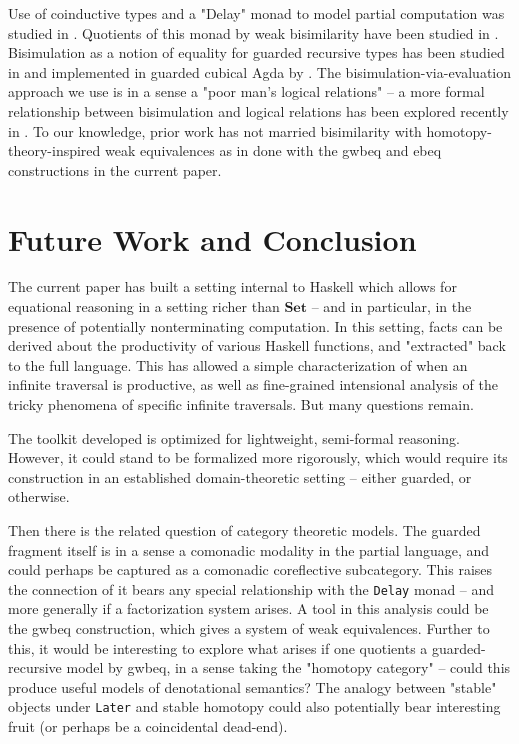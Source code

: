 \documentclass[hoptionsi,review,format=sigplan]{acmart}
\newcommand{\hs}{\texttt}
\begin{document}
Use of coinductive types and a "Delay" monad to model partial computation was studied in \cite{capretta2005general}. Quotients of this monad by weak bisimilarity have been studied in \cite{chapman2019quotienting, uustalu2017delay, altenkirch2017partiality}. Bisimulation as a notion of equality for guarded recursive types has been studied in \cite{mogelberg-veltri:2019} and implemented in guarded cubical Agda by \cite{veltri-vezzosi:2020}. The bisimulation-via-evaluation approach we use is in a sense a "poor man's logical relations"  -- a more formal relationship between bisimulation and logical relations has been explored recently in \cite{hur2012marriage, hermida_reddy_robinson_santamaria_2022}. To our knowledge, prior work has not married bisimilarity with homotopy-theory-inspired weak equivalences as in done with the gwbeq and ebeq constructions in the current paper.


\section{Future Work and Conclusion}

The current paper has built a setting internal to Haskell which allows for equational reasoning in a setting richer than $\mathbf{Set}$ -- and in particular, in the presence of potentially nonterminating computation. In this setting, facts can be derived about the productivity of various Haskell functions, and "extracted" back to the full language. This has allowed a simple characterization of when an infinite traversal is productive, as well as fine-grained intensional analysis of the tricky phenomena of specific infinite traversals. But many questions remain.

The toolkit developed is optimized for lightweight, semi-formal reasoning. However, it could stand to be formalized more rigorously, which would require its construction in an established domain-theoretic setting -- either guarded, or otherwise. 

Then there is the related question of category theoretic models. The guarded fragment itself is in a sense a comonadic modality in the partial language, and could perhaps be captured as a comonadic coreflective subcategory. This raises the connection of it bears any special relationship with the \hs{Delay} monad -- and more generally if a factorization system arises. A tool in this analysis could be the gwbeq construction, which gives a system of weak equivalences. Further to this, it would be interesting to explore what arises if one quotients a guarded-recursive model by gwbeq, in a sense taking the "homotopy category" -- could this produce useful models of denotational semantics? The analogy between "stable" objects under \hs{Later} and stable homotopy could also potentially bear interesting fruit (or perhaps be a coincidental dead-end).
\end{document}
